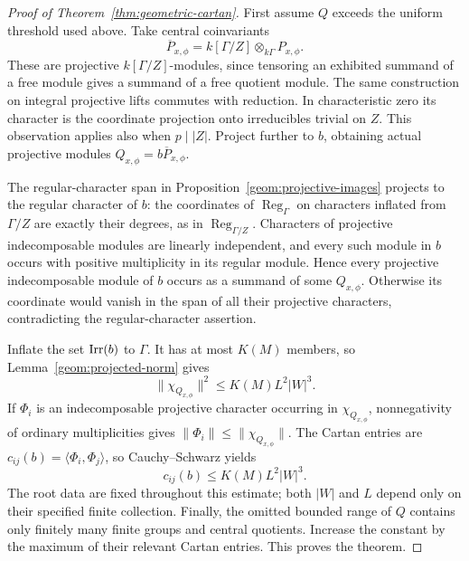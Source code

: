 \begin{proof}[Proof of Theorem~\ref{thm:geometric-cartan}]
First assume \(Q\) exceeds the uniform threshold used above.
Take central coinvariants
\[
 \overline P_{x,\phi}
   =k[\Gamma/Z]\otimes_{k\Gamma}P_{x,\phi}.
\]
These are projective \(k[\Gamma/Z]\)-modules, since tensoring an
exhibited summand of a free module gives a summand of a free quotient
module. The same construction on integral projective lifts commutes
with reduction. In characteristic zero its character is the
coordinate projection onto irreducibles trivial on \(Z\).
This observation applies also when \(p\mid |Z|\).
Project further to \(b\), obtaining actual projective modules
\(Q_{x,\phi}=b\overline P_{x,\phi}\).

The regular-character span in Proposition~\ref{geom:projective-images}
projects to the regular character of \(b\): the coordinates of
\(\operatorname{Reg}_\Gamma\) on characters inflated from
\(\Gamma/Z\) are exactly their degrees, as in
\(\operatorname{Reg}_{\Gamma/Z}\). Characters of projective
indecomposable modules are linearly independent, and every such
module in \(b\) occurs with positive multiplicity in its regular
module. Hence every projective indecomposable module of \(b\) occurs
as a summand of some \(Q_{x,\phi}\). Otherwise its coordinate would
vanish in the span of all their projective characters, contradicting
the regular-character assertion.

Inflate the set \(\operatorname{Irr}(b)\) to \(\Gamma\). It has at most \(K(M)\)
members, so Lemma~\ref{geom:projected-norm} gives
\[
 \|\chi_{Q_{x,\phi}}\|^2\le K(M)L^2|W|^3.
\]
If \(\Phi_i\) is an indecomposable projective character occurring in
\(\chi_{Q_{x,\phi}}\), nonnegativity of ordinary multiplicities gives
\(\|\Phi_i\|\le\|\chi_{Q_{x,\phi}}\|\).
The Cartan entries are
\(c_{ij}(b)=\langle\Phi_i,\Phi_j\rangle\), so Cauchy--Schwarz yields
\[
 c_{ij}(b)\le K(M)L^2|W|^3.
\]
The root data are fixed throughout this estimate; both \(|W|\) and
\(L\) depend only on their specified finite collection. Finally,
the omitted bounded range of \(Q\) contains only finitely many finite
groups and central quotients. Increase the constant by the maximum
of their relevant Cartan entries. This proves the theorem.
\end{proof}
